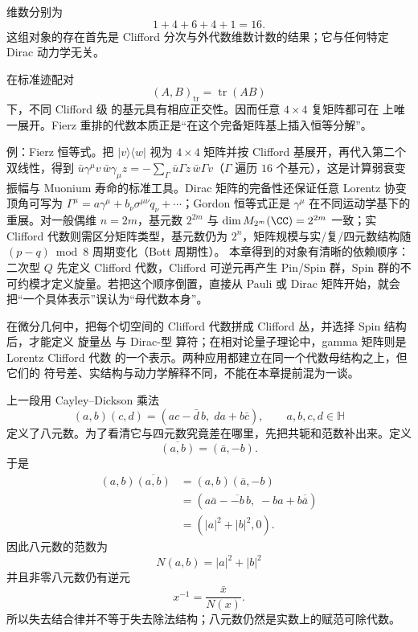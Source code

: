 维数分别为
\[
1+4+6+4+1=16.
\]
这组对象的存在首先是 Clifford 分次与外代数维数计数的结果；它与任何特定 Dirac 动力学无关。

在标准迹配对
\[
(A,B)_{\operatorname{tr}}
=\operatorname{tr}(AB)
\]
下，不同 Clifford 级 的基元具有相应正交性。因而任意 $4\times4$ 复矩阵都可在 上唯一展开。Fierz 重排的代数本质正是“在这个完备矩阵基上插入恒等分解”。

例：Fierz 恒等式。把 $|v\rangle\langle w|$ 视为 $4\times4$ 矩阵并按 Clifford 基展开，再代入第二个双线性，得到 $\bar u\gamma^\mu v\,\bar w\gamma_\mu z=-\sum_\Gamma\bar u\Gamma z\,\bar w\Gamma v$（$\Gamma$ 遍历 $16$ 个基元），这是计算弱衰变振幅与 Muonium 寿命的标准工具。Dirac 矩阵的完备性还保证任意 Lorentz 协变顶角可写为 $\Gamma^\mu=a\gamma^\mu+b_\nu\sigma^{\mu\nu}q_\nu+\cdots$；Gordon 恒等式正是 $\gamma^\mu$ 在不同运动学基下的重展。对一般偶维 $n=2m$，基元数 $2^{2m}$ 与 $\dim M_{2^m}(\CC)=2^{2m}$ 一致；实 Clifford 代数则需区分矩阵类型，基元数仍为 $2^n$，矩阵规模与实/复/四元数结构随 $(p-q)\bmod 8$ 周期变化（Bott 周期性）。
本章得到的对象有清晰的依赖顺序：二次型 $Q$ 先定义 Clifford 代数，Clifford 可逆元再产生 Pin/Spin 群，Spin 群的不可约模才定义旋量。若把这个顺序倒置，直接从 Pauli 或 Dirac 矩阵开始，就会把“一个具体表示”误认为“母代数本身”。

在微分几何中，把每个切空间的 Clifford 代数拼成 Clifford 丛，并选择 Spin 结构 后，才能定义 旋量丛 与 Dirac-型 算符；在相对论量子理论中，gamma 矩阵则是 Lorentz Clifford 代数 的一个表示。两种应用都建立在同一个代数母结构之上，但它们的 符号差、实结构与动力学解释不同，不能在本章提前混为一谈。

上一段用 Cayley--Dickson 乘法
\[
(a,b)(c,d)=(ac-\bar d\,b,\;da+b\bar c),
\qquad a,b,c,d\in\mathbb H
\]
定义了八元数。为了看清它与四元数究竟差在哪里，先把共轭和范数补出来。定义
\[
\overline{(a,b)}=(\bar a,-b).
\]
于是
\[
\begin{aligned}
(a,b)\overline{(a,b)}
&=(a,b)(\bar a,-b)\\
&=(a\bar a-\overline{-b}\,b,\;-ba+b\overline{\bar a})\\
&=(|a|^2+|b|^2,0).
\end{aligned}
\]
因此八元数的范数为
\begin{equation*}\boxed{
N(a,b)=|a|^2+|b|^2
}\end{equation*}
并且非零八元数仍有逆元
\[
x^{-1}=\frac{\bar x}{N(x)}.
\]
所以失去结合律并不等于失去除法结构；八元数仍然是实数上的赋范可除代数。

